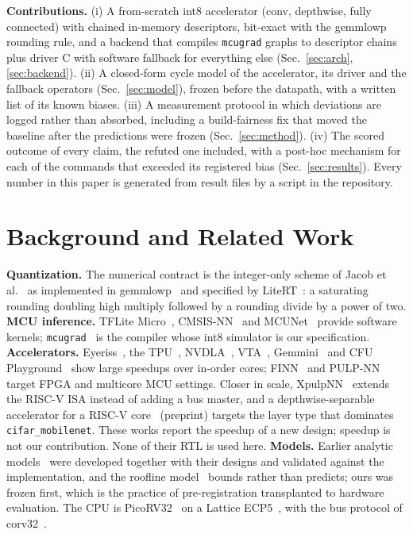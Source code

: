 \documentclass[conference]{IEEEtran}
\begin{document}
\textbf{Contributions.} (i) A from-scratch int8 accelerator (conv, depthwise, fully connected) with chained in-memory descriptors, bit-exact with the gemmlowp rounding rule, and a backend that compiles \texttt{mcugrad} graphs to descriptor chains plus driver C with software fallback for everything else (Sec.~\ref{sec:arch}, \ref{sec:backend}). (ii) A closed-form cycle model of the accelerator, its driver and the fallback operators (Sec.~\ref{sec:model}), frozen before the datapath, with a written list of its known biases. (iii) A measurement protocol in which deviations are logged rather than absorbed, including a build-fairness fix that moved the baseline after the predictions were frozen (Sec.~\ref{sec:method}). (iv) The scored outcome of every claim, the refuted one included, with a post-hoc mechanism for each of the \NExceed{} commands that exceeded its registered bias (Sec.~\ref{sec:results}). Every number in this paper is generated from result files by a script in the repository.

\section{Background and Related Work}\label{sec:related}
\textbf{Quantization.} The numerical contract is the integer-only scheme of Jacob et al.~\cite{jacob2018quantization} as implemented in gemmlowp~\cite{gemmlowp_fixedpoint} and specified by LiteRT~\cite{litert_quantspec}: a saturating rounding doubling high multiply followed by a rounding divide by a power of two. \textbf{MCU inference.} TFLite Micro~\cite{david2021tflm}, CMSIS-NN~\cite{lai2018cmsisnn} and MCUNet~\cite{lin2020mcunet} provide software kernels; \texttt{mcugrad}~\cite{mcugrad_repo} is the compiler whose int8 simulator is our specification.
\textbf{Accelerators.} Eyeriss~\cite{chen2016eyeriss}, the TPU~\cite{jouppi2017tpu}, NVDLA~\cite{nvdla_hw}, VTA~\cite{moreau2018vta}, Gemmini~\cite{genc2021gemmini} and CFU Playground~\cite{prakash2023cfu} show large speedups over in-order cores; FINN~\cite{umuroglu2017finn} and PULP-NN~\cite{garofalo2019pulpnn} target FPGA and multicore MCU settings. Closer in scale, XpulpNN~\cite{garofalo2020xpulpnn} extends the RISC-V ISA instead of adding a bus master, and a depthwise-separable accelerator for a RISC-V core~\cite{yildirim2025dsc} (preprint) targets the layer type that dominates \texttt{cifar\_mobilenet}. These works report the speedup of a new design; speedup is not our contribution. None of their RTL is used here. \textbf{Models.} Earlier analytic models~\cite{zhang2015optimizing,alwani2016fused} were developed together with their designs and validated against the implementation, and the roofline model~\cite{williams2009roofline} bounds rather than predicts; ours was frozen first, which is the practice of pre-registration transplanted to hardware evaluation. The CPU is PicoRV32~\cite{picorv32} on a Lattice ECP5~\cite{lattice_ecp5}, with the bus protocol of corv32~\cite{corv32_repo}.
\end{document}
